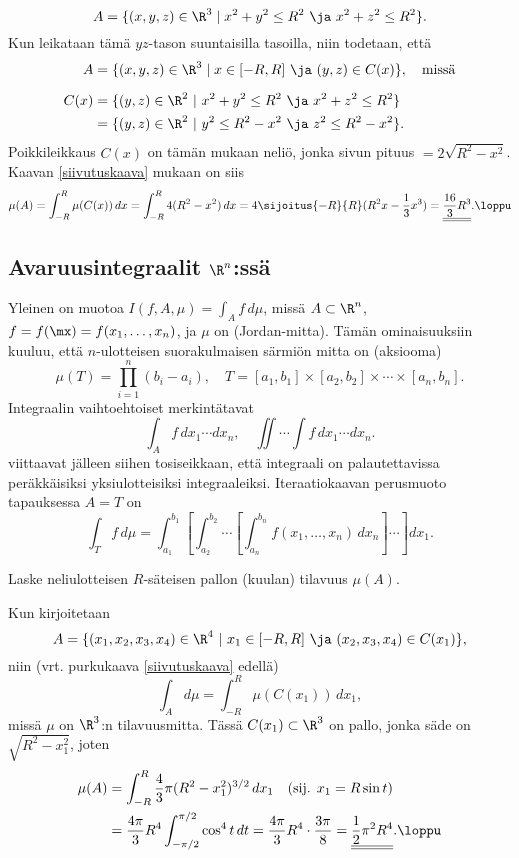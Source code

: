\[
A=\{(x,y,z)\in\R^3 \mid x^2+y^2 \le R^2\ \ja\ x^2+z^2 \le R^2\}.
\]
Kun leikataan tämä $yz$-tason suuntaisilla tasoilla, niin todetaan, että
\begin{align*}
A    &= \{(x,y,z)\in\R^3 \mid x\in [-R,R]\ \ja\ (y,z)\in C(x)\}, \quad \text{missä} \\[2mm]
C(x) &= \{(y,z)\in\R^2 \ | \ x^2+y^2\leq R^2 \ \ja \ x^2+z^2\leq R^2\} \\
     &= \{(y,z)\in\R^2 \ | \ y^2\leq R^2-x^2 \ \ja \ z^2\leq R^2-x^2\}.
\end{align*}
Poikkileikkaus $C(x)$ on tämän mukaan neliö, jonka sivun pituus $=2\sqrt{R^2-x^2}$.
Kaavan \eqref{siivutuskaava} mukaan on siis
\[
\mu(A) = \int_{-R}^R \mu(C(x))\,dx
       = \int_{-R}^R 4(R^2-x^2)\,dx
       = 4\sijoitus{-R}{R}(R^2x-\frac{1}{3}x^3)
       = \underline{\underline{\frac{16}{3}R^3}}. \loppu
\]

\subsection{Avaruusintegraalit $\R^n$:ssä}

Yleinen  on muotoa $I(f,A,\mu)=\int_A f\,d\mu$,
 
%
missä $A\subset\R^n$, $f=f(\mx)=f(x_1,\ldots,x_n)$, ja $\mu$ on  (Jordan-mitta). Tämän ominaisuuksiin kuuluu, että $n$-ulotteisen suorakulmaisen
särmiön mitta on (aksiooma)
\[ 
\mu(T)=\prod_{i=1}^n (b_i-a_i), \quad 
                 T=[a_1,b_1] \times [a_2,b_2] \times \cdots \times [a_n,b_n]. 
\]
Integraalin vaihtoehtoiset merkintätavat
\[
\int_A f\,dx_1\cdots dx_n,\quad \iint\cdots\int f\,dx_1\cdots dx_n.
\]
viittaavat jälleen siihen tosiseikkaan, että integraali on palautettavissa peräkkäisiksi 
yksiulotteisiksi integraaleiksi. Iteraatiokaavan perusmuoto tapauksessa $A=T$ on
\[
\int_T f\,d\mu=\int_{a_1}^{b_1}\left[\int_{a_2}^{b_2} \cdots \left[\int_{a_n}^{b_n} 
                                             f(x_1,\ldots,x_n)\,dx_n\right]\cdots\right]dx_1.
\]
\begin{Exa}
Laske neliulotteisen $R$-säteisen pallon (kuulan) tilavuus $\mu(A)$.
\end{Exa}
\ratk Kun kirjoitetaan
\[
A=\{(x_1,x_2,x_3,x_4)\in\R^4 \ | \ x_1\in [-R,R] \ \ja \ (x_2,x_3,x_4)\in C(x_1)\},
\]
niin (vrt. purkukaava \eqref{siivutuskaava} edellä)
\[
\int_A d\mu=\int_{-R}^R \mu(C(x_1))\,dx_1,
\]
missä $\mu$ on $\R^3$:n tilavuusmitta. Tässä $C(x_1)\subset\R^3$ on pallo, jonka säde on 
$\sqrt{R^2-x_1^2}$, joten
\begin{align*}
\mu(A) &= \int_{-R}^R \frac{4}{3}\pi(R^2-x_1^2)^{3/2}\,dx_1\quad (\text{sij. } x_1=R\sin t) \\
       &= \frac{4\pi}{3}R^4\int_{-\pi/2}^{\pi/2} \cos^4 t\,dt
        = \frac{4\pi}{3}R^4\cdot\frac{3\pi}{8}        
        = \underline{\underline{\frac{1}{2}\pi^2 R^4}}. \loppu
\end{align*}

